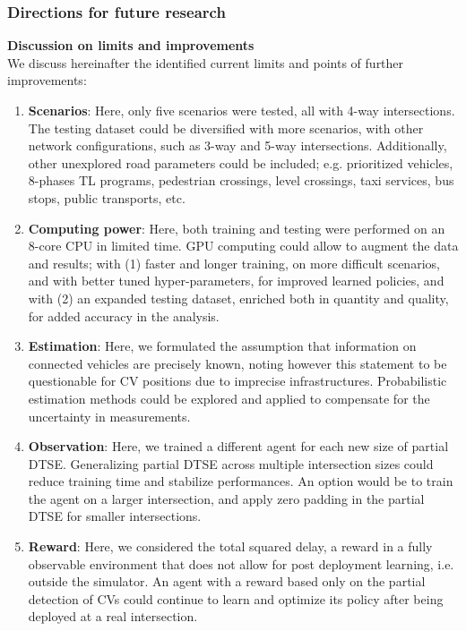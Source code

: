 \pagebreak

\subsubsection{Directions for future research}

\textbf{Discussion on limits and improvements} \\
We discuss hereinafter the identified current limits and points of further improvements: 
\begin{enumerate}
\setlength\itemsep{-0.5em}
  \item \textbf{Scenarios}: Here, only five scenarios were tested, all with 4-way intersections. The testing dataset could be diversified with more scenarios, with other network configurations, such as 3-way and 5-way intersections. Additionally, other unexplored road parameters could be included; e.g. prioritized vehicles, 8-phases TL programs, pedestrian crossings, level crossings, taxi services, bus stops, public transports, etc. 
  \item \textbf{Computing power}: Here, both training and testing were performed on an 8-core CPU in limited time. GPU computing could allow to augment the data and results; with (1) faster and longer training, on more difficult scenarios, and with better tuned hyper-parameters, for improved learned policies, and with (2) an expanded testing dataset, enriched both in quantity and quality, for added accuracy in the analysis.
  \item \textbf{Estimation}: Here, we formulated the assumption that information on connected vehicles are precisely known, noting however this statement to be questionable for CV positions due to imprecise infrastructures. Probabilistic estimation methods could be explored and applied to compensate for the uncertainty in measurements.
  \item \textbf{Observation}: Here, we trained a different agent for each new size of partial DTSE. Generalizing partial DTSE across multiple intersection sizes could reduce training time and stabilize performances. An option would be to train the agent on a larger intersection, and apply zero padding in the partial DTSE for smaller intersections.
  \item \textbf{Reward}: Here, we considered the total squared delay, a reward in a fully observable environment that does not allow for post deployment learning, i.e. outside the simulator. An agent with a reward based only on the partial detection of CVs could continue to learn and optimize its policy after being deployed at a real intersection.

\end{enumerate}
